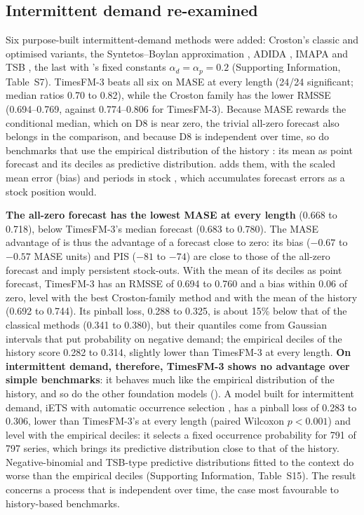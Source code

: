 \subsection{Intermittent demand re-examined}
\label{sec:d8-extended}

Six purpose-built intermittent-demand methods were added: Croston's classic and optimised variants, the
Syntetos--Boylan approximation \citep{syntetos2005accuracy}, ADIDA \citep{nikolopoulos2011adida}, IMAPA
\citep{petropoulos2015imapa} and TSB \citep{teunter2011tsb}, the last with 's fixed
constants $\alpha_d = \alpha_p = 0.2$ (Supporting Information, Table~S7). TimesFM-3 beats all six on MASE at
every length (24/24 significant; median ratios 0.70 to 0.82), while the Croston family has the lower RMSSE
(0.694--0.769, against 0.774--0.806 for TimesFM-3). Because MASE rewards the conditional median, which on D8
is near zero, the trivial all-zero forecast also belongs in the comparison, and because D8 is independent
over time, so do benchmarks that use the empirical distribution of the history
\citep{willemain2004bootstrap}: its mean as point forecast and its deciles as predictive distribution.
 adds them, with the scaled mean error (bias) and periods in stock
\citep[PIS;][]{wallstrom2010pis}, which accumulates forecast errors as a stock position would.



\textbf{The all-zero forecast has the lowest MASE at every length} (0.668 to 0.718), below TimesFM-3's
median forecast (0.683 to 0.780). The MASE advantage of  is thus the advantage of a
forecast close to zero: its bias ($-0.67$ to $-0.57$ MASE units) and PIS ($-81$ to $-74$) are close to those
of the all-zero forecast and imply persistent stock-outs. With the mean of its deciles as point forecast,
TimesFM-3 has an RMSSE of 0.694 to 0.760 and a bias within 0.06 of zero, level with the best Croston-family
method and with the mean of the history (0.692 to 0.744). Its pinball loss, 0.288 to 0.325, is about 15\%
below that of the classical methods (0.341 to 0.380), but their quantiles come from Gaussian intervals that
put probability on negative demand; the empirical deciles of the history score 0.282 to 0.314, slightly
lower than TimesFM-3 at every length. \textbf{On intermittent demand, therefore, TimesFM-3 shows no advantage
over simple benchmarks}: it behaves much like the empirical distribution of the history, and so do the other
foundation models (). A model built for intermittent demand, iETS with automatic
occurrence selection \citep{svetunkov2023iets}, has a pinball loss of 0.283 to 0.306, lower than
TimesFM-3's at every length (paired Wilcoxon $p < 0.001$) and level with the empirical deciles: it selects
a fixed occurrence probability for 791 of 797 series, which brings its predictive distribution close to
that of the history. Negative-binomial and TSB-type predictive distributions fitted to the context do
worse than the empirical deciles (Supporting Information, Table~S15). The result concerns a process that
is independent over time, the
case most favourable to history-based benchmarks.

